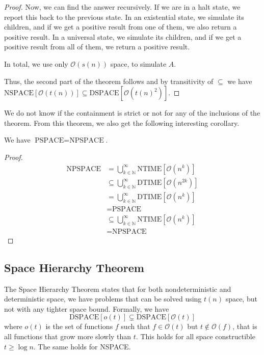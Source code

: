 \begin{proof}
    Now, we can find the answer recursively.
    If we are in a halt state, we report this back to the previous state.
    In an existential state, we simulate its children, and if we get a positive result from one of them, we also return a positive result.
    In a universal state, we simulate its children, and if we get a positive result from all of them, we return a positive result.

    In total, we use only $\mathcal{O}(s(n))$ space, to simulate $A$.

    Thus, the second part of the theorem follows and by transitivity of $\subseteq$ we have $\text{NSPACE}[\mathcal{O}(t(n))] \subseteq \text{DSPACE}[\mathcal{O}(t(n)^2)]$.
\end{proof}

We do not know if the containment is strict or not for any of the inclusions of the theorem.
From this theorem, we also get the following interesting corollary.

\begin{corollary}
    We have $\text{PSPACE} = \text{NPSPACE}$.
\end{corollary}

\begin{proof}
    \begin{align*}
        \text{NPSPACE} &= \bigcup_{k \in \mathbb{N}}^{\infty}\text{NTIME}[\mathcal{O}(n^k)] \\
        &\subseteq \bigcup_{k\in \mathbb{N}}^{\infty}\text{DTIME}[\mathcal{O}(n^{2k})] \\
        &= \bigcup_{k\in \mathbb{N}}^{\infty}\text{DTIME}[\mathcal{O}(n^{k})] \\
        &= \text{PSPACE} \\
        &\subseteq \bigcup_{k\in \mathbb{N}}^{\infty}\text{NTIME}[\mathcal{O}(n^{k})] \\
        &= \text{NPSPACE}
    \end{align*}
\end{proof}

\subsection{Space Hierarchy Theorem}\label{subsec:space-hierarchy-theorem}

The Space Hierarchy Theorem states that for both nondeterministic and deterministic space, we have problems that can be solved using $t(n)$ space, but not with any tighter space bound.
Formally, we have
\[
    \text{DSPACE}[o(t)] \subsetneq \text{DSPACE}[\mathcal{O}(t)]
\]
where $o(t)$ is the set of functions $f$ such that $f \in \mathcal{O}(t)$ but $t \not \in \mathcal{O}(f)$, that is all functions that grow more slowly than $t$.
This holds for all space constructible $t \geq \log n$.
The same holds for NSPACE\@.

